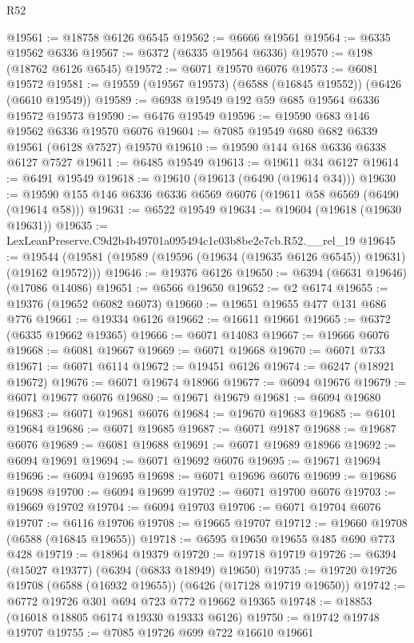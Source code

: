 \begin{lexlean}{R52}
\begin{coremodule}
@19561 := @18758 @6126 @6545
@19562 := @6666 @19561
@19564 := @6335 @19562 @6336
@19567 := @6372 (@6335 @19564 @6336)
@19570 := @198 (@18762 @6126 @6545)
@19572 := @6071 @19570 @6076
@19573 := @6081 @19572
@19581 := @19559 (@19567 @19573) (@6588 (@16845 @19552)) (@6426 (@6610 @19549))
@19589 := @6938 @19549 @192 @59 @685 @19564 @6336 @19572 @19573
@19590 := @6476 @19549
@19596 := @19590 @683 @146 @19562 @6336 @19570 @6076
@19604 := @7085 @19549 @680 @682 @6339 @19561 (@6128 @7527) @19570
@19610 := @19590 @144 @168 @6336 @6338 @6127 @7527
@19611 := @6485 @19549
@19613 := @19611 @34 @6127
@19614 := @6491 @19549
@19618 := @19610 (@19613 (@6490 (@19614 @34)))
@19630 := @19590 @155 @146 @6336 @6336 @6569 @6076 (@19611 @58 @6569 (@6490 (@19614 @58)))
@19631 := @6522 @19549
@19634 := @19604 (@19618 (@19630 @19631))
@19635 := LexLeanPreserve.C9d2b4b49701a095494c1c03b8be2e7cb.R52.__rel_19
@19645 := @19544 (@19581 (@19589 (@19596 (@19634 (@19635 @6126 @6545)) @19631) (@19162 @19572)))
@19646 := @19376 @6126
@19650 := @6394 (@6631 @19646) (@17086 @14086)
@19651 := @6566 @19650
@19652 := @2 @6174
@19655 := @19376 (@19652 @6082 @6073)
@19660 := @19651 @19655 @477 @131 @686 @776
@19661 := @19334 @6126
@19662 := @16611 @19661
@19665 := @6372 (@6335 @19662 @19365)
@19666 := @6071 @14083
@19667 := @19666 @6076
@19668 := @6081 @19667
@19669 := @6071 @19668
@19670 := @6071 @733
@19671 := @6071 @6114
@19672 := @19451 @6126
@19674 := @6247 (@18921 @19672)
@19676 := @6071 @19674 @18966
@19677 := @6094 @19676
@19679 := @6071 @19677 @6076
@19680 := @19671 @19679
@19681 := @6094 @19680
@19683 := @6071 @19681 @6076
@19684 := @19670 @19683
@19685 := @6101 @19684
@19686 := @6071 @19685
@19687 := @6071 @9187
@19688 := @19687 @6076
@19689 := @6081 @19688
@19691 := @6071 @19689 @18966
@19692 := @6094 @19691
@19694 := @6071 @19692 @6076
@19695 := @19671 @19694
@19696 := @6094 @19695
@19698 := @6071 @19696 @6076
@19699 := @19686 @19698
@19700 := @6094 @19699
@19702 := @6071 @19700 @6076
@19703 := @19669 @19702
@19704 := @6094 @19703
@19706 := @6071 @19704 @6076
@19707 := @6116 @19706
@19708 := @19665 @19707
@19712 := @19660 @19708 (@6588 (@16845 @19655))
@19718 := @6595 @19650 @19655 @485 @690 @773 @428
@19719 := @18964 @19379
@19720 := @19718 @19719
@19726 := @6394 (@15027 @19377) (@6394 (@6833 @18949) @19650)
@19735 := @19720 @19726 @19708 (@6588 (@16932 @19655)) (@6426 (@17128 @19719 @19650))
@19742 := @6772 @19726 @301 @694 @723 @772 @19662 @19365
@19748 := @18853 (@16018 @18805 @6174 @19330 @19333 @6126)
@19750 := @19742 @19748 @19707
@19755 := @7085 @19726 @699 @722 @16610 @19661

\end{coremodule}
\end{lexlean}
